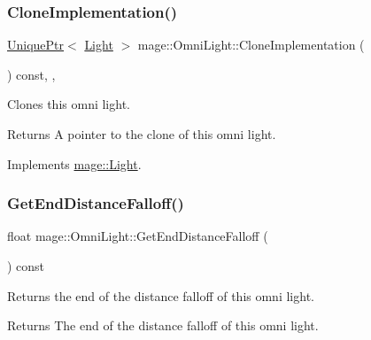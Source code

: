 \subsubsection{\texorpdfstring{Clone\+Implementation()}{CloneImplementation()}}
{\footnotesize\ttfamily \hyperlink{namespacemage_a8c307fbcc33bce9b7f2aa4c26c3b95cf}{Unique\+Ptr}$<$ \hyperlink{classmage_1_1_light}{Light} $>$ mage\+::\+Omni\+Light\+::\+Clone\+Implementation (\begin{DoxyParamCaption}{ }\end{DoxyParamCaption}) const\hspace{0.3cm}{\ttfamily [override]}, {\ttfamily [private]}, {\ttfamily [virtual]}}

Clones this omni light.

\begin{DoxyReturn}{Returns}
A pointer to the clone of this omni light. 
\end{DoxyReturn}


Implements \hyperlink{classmage_1_1_light_aa613d76a1ebda69efde853d15f75490c}{mage\+::\+Light}.

\hypertarget{classmage_1_1_omni_light_a1bd4d9eb6a22ae78e1780f142039611c}{}\label{classmage_1_1_omni_light_a1bd4d9eb6a22ae78e1780f142039611c} 
\subsubsection{\texorpdfstring{Get\+End\+Distance\+Falloff()}{GetEndDistanceFalloff()}}
{\footnotesize\ttfamily float mage\+::\+Omni\+Light\+::\+Get\+End\+Distance\+Falloff (\begin{DoxyParamCaption}{ }\end{DoxyParamCaption}) const\hspace{0.3cm}{\ttfamily [noexcept]}}

Returns the end of the distance falloff of this omni light.

\begin{DoxyReturn}{Returns}
The end of the distance falloff of this omni light. 
\end{DoxyReturn}
\hypertarget{classmage_1_1_omni_light_adb7811b447e8b4679b21123c01c6d6fb}{}\label{classmage_1_1_omni_light_adb7811b447e8b4679b21123c01c6d6fb} 
